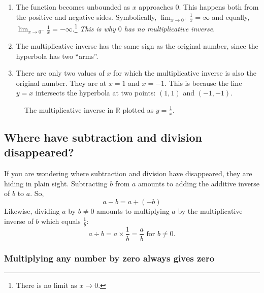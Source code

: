 \documentclass[
  a4paper,
]{article}
\begin{document}
\begin{enumerate}
\def\labelenumi{\alph{enumi}.}
\item
  The function becomes unbounded as \(x\) approaches \(0\). This happens
  both from the positive and negative sides. Symbolically,
  \(\lim_{x \to 0^{+}}\frac{1}{x}=\infty\) and equally,
  \(\lim_{x \to 0^{-}}\frac{1}{x}=-\infty\).\footnote{There is no limit
    as \(x \to 0\).} \emph{This is why \(0\) has no multiplicative
  inverse}.
\item
  The multiplicative inverse has the same sign as the original number,
  since the hyperbola has two ``arms''.
\item
  There are only two values of \(x\) for which the multiplicative
  inverse is also the original number. They are at \(x = 1\) and
  \(x = -1\). This is because the line \(y = x\) intersects the
  hyperbola at two points: \((1, 1)\) and \((-1, -1)\).
\end{enumerate}

\begin{figure}
\hypertarget{fig:hyperbola}{%
\centering

\caption{The multiplicative inverse in \(\mathbb{R}\) plotted as
\(y = \frac{1}{x}\).}\label{fig:hyperbola}
}
\end{figure}

\hypertarget{where-have-subtraction-and-division-disappeared}{%
\subsection{Where have subtraction and division
disappeared?}\label{where-have-subtraction-and-division-disappeared}}

If you are wondering where subtraction and division have disappeared,
they are hiding in plain sight. Subtracting \(b\) from \(a\) amounts to
adding the additive inverse of \(b\) to \(a\). So, \[
a - b = a + (-b)
\] Likewise, dividing \(a\) by \(b \ne 0\) amounts to multiplying \(a\)
by the multiplicative inverse of \(b\) which equals \(\frac{1}{b}\): \[
a \div b = a \times \frac{1}{b} = \frac{a}{b} \text{ for } b \ne 0.
\]

\hypertarget{multiplying-any-number-by-zero-always-gives-zero}{%
\subsubsection{Multiplying any number by zero always gives
zero}\label{multiplying-any-number-by-zero-always-gives-zero}}
\end{document}
